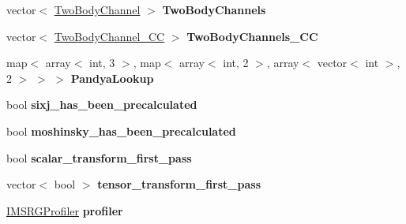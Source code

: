 \begin{DoxyCompactItemize}
\item 
vector$<$ \hyperlink{classTwoBodyChannel}{Two\+Body\+Channel} $>$ {\bfseries Two\+Body\+Channels}\hypertarget{classModelSpace_abf47bbec623fcfd063d45451581fde38}{}\label{classModelSpace_abf47bbec623fcfd063d45451581fde38}

\item 
vector$<$ \hyperlink{classTwoBodyChannel__CC}{Two\+Body\+Channel\+\_\+\+CC} $>$ {\bfseries Two\+Body\+Channels\+\_\+\+CC}\hypertarget{classModelSpace_a17dcaa8731272e28762d8b785d8786b2}{}\label{classModelSpace_a17dcaa8731272e28762d8b785d8786b2}

\item 
map$<$ array$<$ int, 3 $>$, map$<$ array$<$ int, 2 $>$, array$<$ vector$<$ int $>$, 2 $>$ $>$ $>$ {\bfseries Pandya\+Lookup}\hypertarget{classModelSpace_a386a977fced025398b2531f6ce5d7cc3}{}\label{classModelSpace_a386a977fced025398b2531f6ce5d7cc3}

\item 
bool {\bfseries sixj\+\_\+has\+\_\+been\+\_\+precalculated}\hypertarget{classModelSpace_add8f51396475dd1c0035a1a9e6e6f452}{}\label{classModelSpace_add8f51396475dd1c0035a1a9e6e6f452}

\item 
bool {\bfseries moshinsky\+\_\+has\+\_\+been\+\_\+precalculated}\hypertarget{classModelSpace_a4efe26f443e19138189e8934c7eda80c}{}\label{classModelSpace_a4efe26f443e19138189e8934c7eda80c}

\item 
bool {\bfseries scalar\+\_\+transform\+\_\+first\+\_\+pass}\hypertarget{classModelSpace_ab871d46ec0a635ed4816e99cbe5bb573}{}\label{classModelSpace_ab871d46ec0a635ed4816e99cbe5bb573}

\item 
vector$<$ bool $>$ {\bfseries tensor\+\_\+transform\+\_\+first\+\_\+pass}\hypertarget{classModelSpace_a755498ab59d59123108cd731dba6ba6f}{}\label{classModelSpace_a755498ab59d59123108cd731dba6ba6f}

\item 
\hyperlink{classIMSRGProfiler}{I\+M\+S\+R\+G\+Profiler} {\bfseries profiler}\hypertarget{classModelSpace_a9d5b193fe45f361371beb818bfe00fd3}{}\label{classModelSpace_a9d5b193fe45f361371beb818bfe00fd3}

\end{DoxyCompactItemize}
